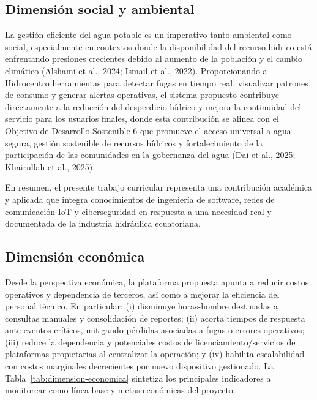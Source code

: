 \documentclass[12pt,a4paper,oneside]{report}
\begin{document}
\subsection*{Dimensión social y ambiental}

La gestión eficiente del agua potable es un imperativo tanto ambiental como social, especialmente en contextos donde la disponibilidad del recurso hídrico está enfrentando presiones crecientes debido al aumento de la población y el cambio climático (Alshami et al., 2024; Ismail et al., 2022). Proporcionando a Hidrocentro herramientas para detectar fugas en tiempo real, visualizar patrones de consumo y generar alertas operativas, el sistema propuesto contribuye directamente a la reducción del desperdicio hídrico y mejora la continuidad del servicio para los usuarios finales, donde esta contribución se alinea con el Objetivo de Desarrollo Sostenible 6 que promueve el acceso universal a agua segura, gestión sostenible de recursos hídricos y fortalecimiento de la participación de las comunidades en la gobernanza del agua (Dai et al., 2025; Khairullah et al., 2025).

En resumen, el presente trabajo curricular representa una contribución académica y aplicada que integra conocimientos de ingeniería de software, redes de comunicación IoT y ciberseguridad en respuesta a una necesidad real y documentada de la industria hidráulica ecuatoriana.

\subsection*{Dimensión económica}

Desde la perspectiva económica, la plataforma propuesta apunta a reducir costos operativos y dependencia de terceros, así como a mejorar la eficiencia del personal técnico. En particular: (i) disminuye horas-hombre destinadas a consultas manuales y consolidación de reportes; (ii) acorta tiempos de respuesta ante eventos críticos, mitigando pérdidas asociadas a fugas o errores operativos; (iii) reduce la dependencia y potenciales costos de licenciamiento/servicios de plataformas propietarias al centralizar la operación; y (iv) habilita escalabilidad con costos marginales decrecientes por nuevo dispositivo gestionado. La Tabla~\ref{tab:dimension-economica} sintetiza los principales indicadores a monitorear como línea base y metas económicas del proyecto.
\end{document}
